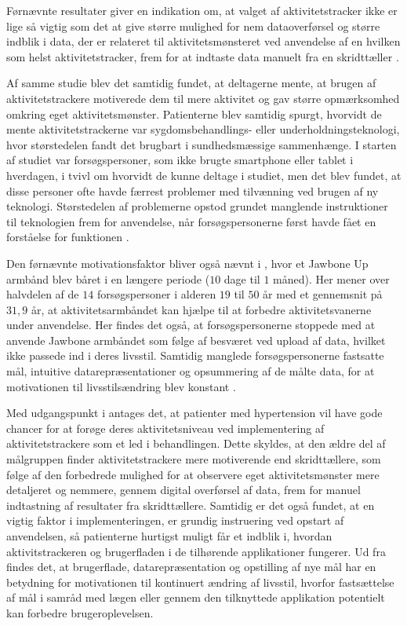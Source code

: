 Førnævnte resultater giver en indikation om, at valget af aktivitetstracker ikke er lige så vigtig som det at give større mulighed for nem dataoverførsel og større indblik i data, der er relateret til aktivitetsmønsteret ved anvendelse af en hvilken som helst aktivitetstracker, frem for at indtaste data manuelt fra en skridttæller \citep{mercer2016}.

Af samme studie blev det samtidig fundet, at deltagerne mente, at brugen af aktivitetstrackere motiverede dem til mere aktivitet og gav større opmærksomhed omkring eget aktivitetsmønster. Patienterne blev samtidig spurgt, hvorvidt de mente aktivitetstrackerne var sygdomsbehandlings- eller underholdningsteknologi, hvor størstedelen fandt det brugbart i sundhedsmæssige sammenhænge. I starten af studiet var forsøgspersoner, som ikke brugte smartphone eller tablet i hverdagen, i tvivl om hvorvidt de kunne deltage i studiet, men det blev fundet, at disse personer ofte havde færrest problemer med tilvænning ved brugen af ny teknologi. Størstedelen af problemerne opstod grundet manglende instruktioner til teknologien frem for anvendelse, når forsøgspersonerne først havde fået en forståelse for funktionen \citep{mercer2016}.

Den førnævnte motivationsfaktor bliver også nævnt i \citeauthor{rapp2016}, hvor et Jawbone Up armbånd blev båret i en længere periode ($10$ dage til $1$ måned). Her mener over halvdelen af de $14$ forsøgspersoner i alderen $19$ til $50$ år med et gennemsnit på $31,9$ år, at aktivitetsarmbåndet kan hjælpe til at forbedre aktivitetsvanerne under anvendelse. Her findes det også, at forsøgspersonerne stoppede med at anvende Jawbone armbåndet som følge af besværet ved upload af data, hvilket ikke passede ind i deres livsstil. Samtidig manglede forsøgspersonerne fastsatte mål, intuitive datarepræsentationer og opsummering af de målte data, for at motivationen til livsstilsændring blev konstant \citep{rapp2016}.

Med udgangspunkt i \citeauthor{mercer2016} antages det, at patienter med hypertension vil have gode chancer for at forøge deres aktivitetsniveau ved implementering af aktivitetstrackere som et led i behandlingen. Dette skyldes, at den ældre del af målgruppen finder aktivitetstrackere mere motiverende end skridttællere, som følge af den forbedrede mulighed for at observere eget aktivitetsmønster mere detaljeret og nemmere, gennem digital overførsel af data, frem for manuel indtastning af resultater fra skridttællere. Samtidig er det også fundet, at en vigtig faktor i implementeringen, er grundig instruering ved opstart af anvendelsen, så patienterne hurtigst muligt får et indblik i, hvordan aktivitstrackeren og brugerfladen i de tilhørende applikationer fungerer. Ud fra \citeauthor{rapp2016} findes det, at brugerflade, datarepræsentation og opstilling af nye mål har en betydning for motivationen til kontinuert ændring af livsstil, hvorfor fastsættelse af mål i samråd med lægen eller gennem den tilknyttede applikation potentielt kan forbedre brugeroplevelsen.


